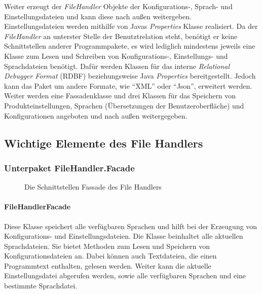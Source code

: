 \documentclass[parskip=full]{scrartcl}
\begin{document}
Weiter erzeugt der \textit{FileHandler} Objekte der Konfigurations-, Sprach- und Einstellungsdateien und kann diese nach außen weitergeben. \\
Einstellungsdateien werden mithilfe von Javas \textit{Properties} Klasse realisiert.
Da der \textit{FileHandler} an unterster Stelle der Benutztrelation steht, benötigt er keine Schnittstellen anderer Programmpakete, es wird lediglich mindestens jeweils eine Klasse zum Lesen und Schreiben von Konfigurations-, Einstellungs- und Sprachdateien benötigt.
Dafür werden Klassen für das interne \textit{Relational Debugger Format }(RDBF)  beziehungsweise Java \textit{Properties} bereitgestellt. Jedoch kann das Paket um andere Formate, wie \enquote{XML} oder \enquote{Json}, erweitert werden.
Weiter werden eine Fassadenklasse und drei Klassen für das Speichern von Produkteinstellungen, Sprachen (Übersetzungen der Benutzeroberfläche) und Konfigurationen angeboten und nach außen weitergegeben.
\subsection{Wichtige Elemente des File Handlers}
\subsubsection{Unterpaket FileHandler.Facade}
\begin{figure}[!h]
\caption{Die Schnittstellen Fassade des File Handlers}
\label{fig:facade_fileHandler}
\end{figure}
\paragraph{FileHandlerFacade}
Diese Klasse speichert alle verfügbaren Sprachen und hilft bei der Erzeugung von Konfigurations- und Einstellungsdateien.
Die Klasse beinhaltet alle aktuellen Sprachdateien.
Sie bietet Methoden zum Lesen und Speichern von Konfigurationsdateien an. Dabei können auch Textdateien, die einen Programmtext enthalten, gelesen werden.
Weiter kann die aktuelle Einstellungsdatei abgerufen werden, sowie alle verfügbaren Sprachen und eine bestimmte Sprachdatei.
\end{document}
